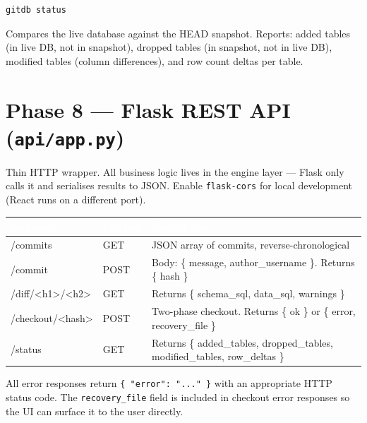 \documentclass[12pt, a4paper]{article}
\begin{document}
\begin{tcolorbox}[commandbox, title=\texttt{gitdb status}]
\begin{lstlisting}
gitdb status
\end{lstlisting}
\textcolor{codetext}{\small Compares the live database against the HEAD
snapshot. Reports: added tables (in live DB, not in snapshot), dropped tables
(in snapshot, not in live DB), modified tables (column differences), and row
count deltas per table.}
\end{tcolorbox}

\section{Phase 8 --- Flask REST API (\texttt{api/app.py})}

Thin HTTP wrapper. All business logic lives in the engine layer --- Flask only
calls it and serialises results to JSON. Enable \texttt{flask-cors} for local
development (React runs on a different port).

\vspace{0.5em}
\renewcommand{\arraystretch}{1.4}
\begin{tabularx}{\textwidth}{>{\ttfamily}p{4.5cm} >{\ttfamily}p{1.5cm} X}
\rowcolor{tableheader}
\textcolor{white}{\normalfont\bfseries Endpoint} &
\textcolor{white}{\normalfont\bfseries Method} &
\textcolor{white}{\normalfont\bfseries Description} \\
\midrule
/commits & GET & JSON array of commits, reverse-chronological \\
\rowcolor{lightgray}
/commit  & POST & Body: \{ message, author\_username \}. Returns \{ hash \} \\
/diff/<h1>/<h2> & GET & Returns \{ schema\_sql, data\_sql, warnings \} \\
\rowcolor{lightgray}
/checkout/<hash> & POST & Two-phase checkout. Returns \{ ok \} or \{ error, recovery\_file \} \\
/status & GET & Returns \{ added\_tables, dropped\_tables, modified\_tables, row\_deltas \} \\
\end{tabularx}
\vspace{0.5em}

\begin{tcolorbox}[infobox]
All error responses return \texttt{\{ "error": "..." \}} with an appropriate
HTTP status code. The \texttt{recovery\_file} field is included in checkout
error responses so the UI can surface it to the user directly.
\end{tcolorbox}
\end{document}
